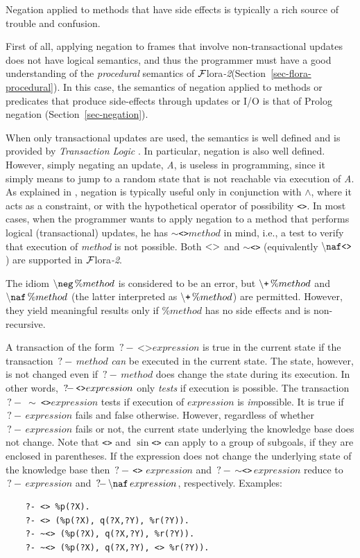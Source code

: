 \documentclass[11pt]{article}
\newcommand{\FLSYSTEM}{{\mbox{\sc ${\cal F}${lora}\rm\emph{-2}}}\xspace}
\newcommand{\query}{\mbox{$\, ?\! - \, $}}                  %
\newcommand{\bs}{{\ensuremath\backslash}}
\newcommand{\PLGNAF}{\mbox{\tt \ensuremath{\tt\backslash}+}\xspace}
\newcommand{\RULELOGNAF}{{\texttt{\ensuremath{\tt\backslash}naf}}\xspace}
\begin{document}
Negation applied to methods that have side effects is typically a rich source
of trouble and confusion.

First of all, applying negation to frames that involve
non-transactional updates does not have logical semantics, and thus the
programmer must have a good understanding of the \emph{procedural} semantics of
\FLSYSTEM (Section~\ref{sec-flora-procedural}).
In this case, the semantics of negation applied to methods or predicates that produce
side-effects through updates  or I/O is that of Prolog negation
(Section~\ref{sec-negation}).

When only transactional updates are used, the semantics is well defined and
is provided by \emph{Transaction Logic}
\cite{trans-chapter-98,trans-tcs94}. In particular, negation is also well
defined. However, simply negating an update, \emph{A}, is useless in
programming, since it simply means to jump to a random state that is not
reachable via execution of \emph{A}.  As explained in
\cite{trans-chapter-98,trans-tcs94}, negation is typically useful only in conjunction
with $\wedge$, where it acts as a constraint, or with the hypothetical
operator of possibility \texttt{<>}.  In most cases, when the programmer
wants to apply negation to a method that performs logical (transactional)
updates, he has \texttt{$\sim$<>}$method$  in mind, i.e., a test to
verify that execution of \emph{method}  is not possible.
Both $\tt<>$ and \texttt{$\sim$<>} (equivalently $\tt\RULELOGNAF \texttt{<>}$) are supported in \FLSYSTEM.

The idiom ${\tt \bs{}neg}\,\%method$ is considered to be an error, but
$\PLGNAF\,\%method$ and $\RULELOGNAF\,\%method$ (the latter interpreted as
$\PLGNAF\,\%method$) are permitted. However, they yield meaningful results only
if $\%method$ has no side effects and is non-recursive.

A transaction of the form $\query \texttt{<>} expression$ is true in the current
state if the transaction $\query method$ \emph{can} be executed in the current
state. The state, however, is not changed even if  $\query method$
does change the state during its execution. In other words, $\texttt{\query <>}
expression$ only \emph{tests} if execution is possible.
The transaction \texttt{\query} \texttt{$\sim$ <>}$expression$ tests if execution of
$expression$ is \emph{im}possible. It is true if $\query expression$ fails
and false otherwise. However, regardless of whether $\query expression$
fails or not, the current state underlying the knowledge base does not
change.
Note that \texttt{<>} and \texttt{$\sin$<>} can apply to a group of
subgoals, if they are enclosed in parentheses.  If the expression does not
change the underlying state of the knowledge base then
\texttt{\query <>} $expression$ and \query\texttt{$\sim$<>}\,$expression$ reduce to
$\query expression$ and $\query \RULELOGNAF\,expression$, respectively.
Examples:
\begin{verbatim}
    ?- <> %p(?X).
    ?- <> (%p(?X), q(?X,?Y), %r(?Y)).
    ?- ~<> (%p(?X), q(?X,?Y), %r(?Y)).
    ?- ~<> (%p(?X), q(?X,?Y), <> %r(?Y)).
\end{verbatim}
\end{document}
